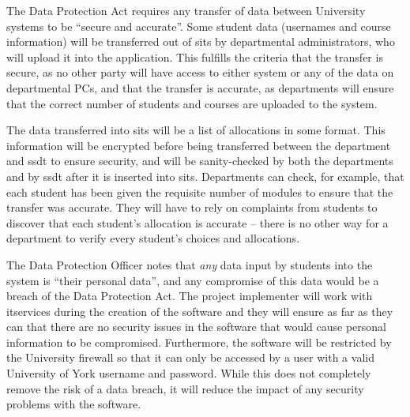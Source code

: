 \mynobreakpar

The Data Protection Act requires any transfer of data between University
systems to be ``secure and accurate''. Some student data (usernames and course
information) will be transferred out of \gls{sits} by departmental
administrators, who will upload it into the application. This fulfills the
criteria that the transfer is secure, as no other party will have access to
either system or any of the data on departmental PCs, and that the transfer is
accurate, as departments will ensure that the correct number of students and
courses are uploaded to the system.

The data transferred into \gls{sits} will be a list of allocations in some
format. This information will be encrypted before being transferred between
the department and \gls{ssdt} to ensure security, and will be sanity-checked
by both the departments and by \gls{ssdt} after it is inserted into
\gls{sits}. Departments can check, for example, that each student has been
given the requisite number of modules to ensure that the transfer was
accurate. They will have to rely on complaints from students to discover that
each student's allocation is accurate -- there is no other way for a
department to verify every student's choices and allocations.

\mynobreakpar

The Data Protection Officer notes that \emph{any} data input by students into
the system is ``their personal data'', and any compromise of this data would
be a breach of the Data Protection Act. The project implementer will work with
\gls{itservices} during the creation of the software and they will ensure as
far as they can that there are no security issues in the software that would
cause personal information to be compromised. Furthermore, the software will
be restricted by the University firewall so that it can only be accessed by a
user with a valid University of York username and password. While this does
not completely remove the risk of a data breach, it will reduce the impact of
any security problems with the software.
